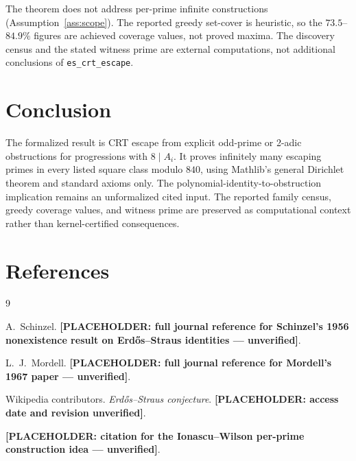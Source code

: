 \documentclass[11pt,a4paper]{article}
\theoremstyle{definition}
\begin{document}
The theorem does not address per-prime infinite constructions
(Assumption~\ref{ass:scope}). The reported greedy set-cover is heuristic,
so the $73.5$--$84.9\%$ figures are achieved coverage values, not proved
maxima. The discovery census and the stated witness prime are external
computations, not additional conclusions of \texttt{es\_crt\_escape}.

\section{Conclusion}

The formalized result is CRT escape from explicit odd-prime or 2-adic
obstructions for progressions with $8\mid A_i$. It proves infinitely
many escaping primes in every listed square class modulo $840$, using
Mathlib's general Dirichlet theorem and standard axioms only. The
polynomial-identity-to-obstruction implication remains an unformalized
cited input. The reported family census, greedy coverage values, and
witness prime are preserved as computational context rather than
kernel-certified consequences.

\section{References}

\begin{thebibliography}{9}

A.~Schinzel.
\textbf{[PLACEHOLDER: full journal reference for Schinzel's 1956
nonexistence result on Erd\H{o}s--Straus identities --- unverified]}.

L.~J.~Mordell.
\textbf{[PLACEHOLDER: full journal reference for Mordell's 1967 paper ---
unverified]}.

Wikipedia contributors.
\textit{Erd\H{o}s--Straus conjecture}.
\textbf{[PLACEHOLDER: access date and revision unverified]}.

\textbf{[PLACEHOLDER: citation for the Ionascu--Wilson per-prime
construction idea ---
unverified]}.

\end{thebibliography}
\end{document}
